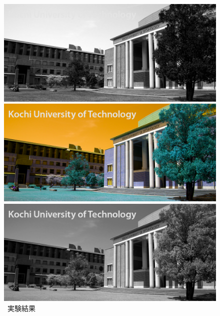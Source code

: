 \begin{figure}[h]
\begin{minipage}[b]{.19\textwidth}
    \end{minipage}
    \begin{minipage}[b]{.19\textwidth}
        \centering
        \includegraphics[keepaspectratio,width=\textwidth]{../../Figures/05_13_b.png}
    \end{minipage}
    \begin{minipage}[b]{.19\textwidth}
        \centering
        \includegraphics[keepaspectratio,width=\textwidth]{../../Figures/05_14_change.png}
    \end{minipage}
    \caption{\kadaiaa\ 実験結果}
    \vsp
    \begin{minipage}[b]{.23\textwidth}
        \centering
        \includegraphics[keepaspectratio,width=\textwidth]{../../Figures/05_21_gimg.png}

\end{minipage}
\end{figure}
